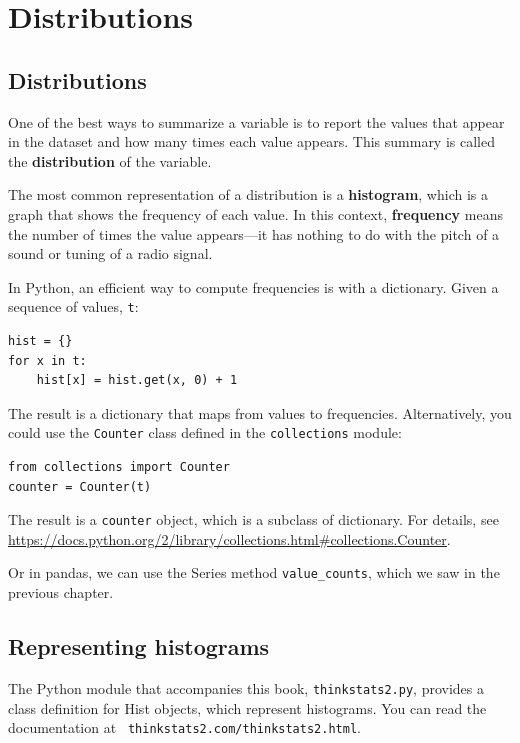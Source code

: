 \documentclass[12pt]{book}
\begin{document}
\chapter{Distributions}
\label{descriptive}

\section{Distributions}
\label{distributions}

One of the best ways to summarize a variable is to report the
values that appear in the dataset and how many times each
value appears.  This summary is called the {\bf distribution}
of the variable.

The most common representation of a distribution is a {\bf histogram},
which is a graph that shows the frequency
of each value.
In this context, {\bf frequency} means the number of times the value
appears---it has nothing to do with the pitch of a sound
or tuning of a radio signal.

In Python, an efficient way to compute frequencies is with a dictionary.
Given a sequence of values, {\tt t}:
%
\begin{verbatim}
hist = {}
for x in t:
    hist[x] = hist.get(x, 0) + 1
\end{verbatim}

The result is a dictionary that maps from values to frequencies.
Alternatively, you could use the {\tt Counter} class defined in the
{\tt collections} module:

\begin{verbatim}
from collections import Counter
counter = Counter(t)
\end{verbatim}

The result is a {\tt counter} object, which is a subclass of
dictionary.  For details, see
\url{https://docs.python.org/2/library/collections.html#collections.Counter}.

Or in pandas, we can use the
Series method \verb"value_counts", which we saw in the previous
chapter.


\section{Representing histograms}

The Python module that accompanies this book, {\tt thinkstats2.py},
provides a class definition for Hist objects, which represent
histograms.  You can read the documentation at {\tt
  thinkstats2.com/thinkstats2.html}.
\end{document}
